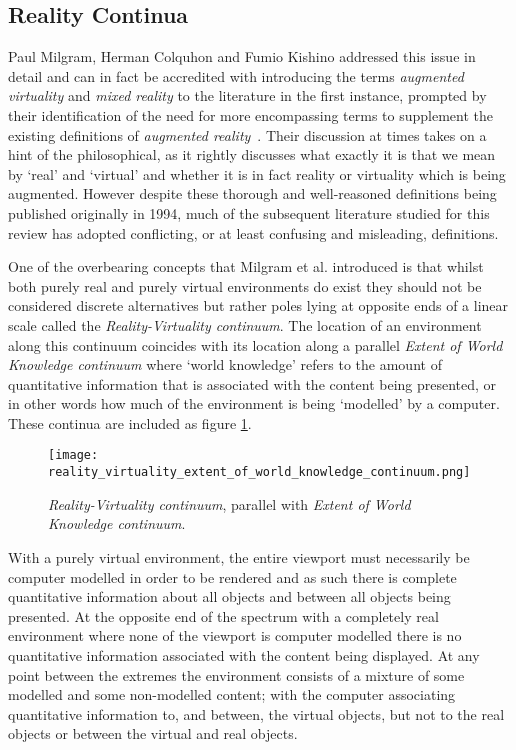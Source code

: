
\subsection{Reality Continua}
Paul Milgram, Herman Colquhon and Fumio Kishino addressed this issue in detail and can in fact be accredited with introducing the terms \textit{augmented virtuality} and \textit{mixed reality} to the literature in the first instance, prompted by their identification of the need for more encompassing terms to supplement the existing definitions of \textit{augmented reality}~\cite{Milgram1994, Milgram1999}. Their discussion at times takes on a hint of the philosophical, as it rightly discusses what exactly it is that we mean by `real' and `virtual' and whether it is in fact reality or virtuality which is being augmented. However despite these thorough and well-reasoned definitions being published originally in 1994, much of the subsequent literature studied for this review has adopted conflicting, or at least confusing and misleading, definitions.

One of the overbearing concepts that Milgram et al. introduced is that whilst both purely real and purely virtual environments do exist they should not be considered discrete alternatives but rather poles lying at opposite ends of a linear scale called the \textit{Reality-Virtuality continuum}. The location of an environment along this continuum coincides with its location along a parallel \textit{Extent of World Knowledge continuum} where `world knowledge' refers to the amount of quantitative information that is associated with the content being presented, or in other words how much of the environment is being `modelled' by a computer. These continua are included as figure \ref{reality_virtuality_extent_of_world_knowledge_continuum}.

\begin{figure}[h]
\centering
\texttt{[image: reality\_virtuality\_extent\_of\_world\_knowledge\_continuum.png]}
\caption{\textit{Reality-Virtuality continuum}, parallel with \textit{Extent of World Knowledge continuum}.}
\label{reality_virtuality_extent_of_world_knowledge_continuum}
\end{figure}

With a purely virtual environment, the entire viewport must necessarily be computer modelled in order to be rendered and as such there is complete quantitative information about all objects and between all objects being presented. At the opposite end of the spectrum with a completely real environment where none of the viewport is computer modelled there is no quantitative information associated with the content being displayed. At any point between the extremes the environment consists of a mixture of some modelled and some non-modelled content; with the computer associating quantitative information to, and between, the virtual objects, but not to the real objects or between the virtual and real objects.

